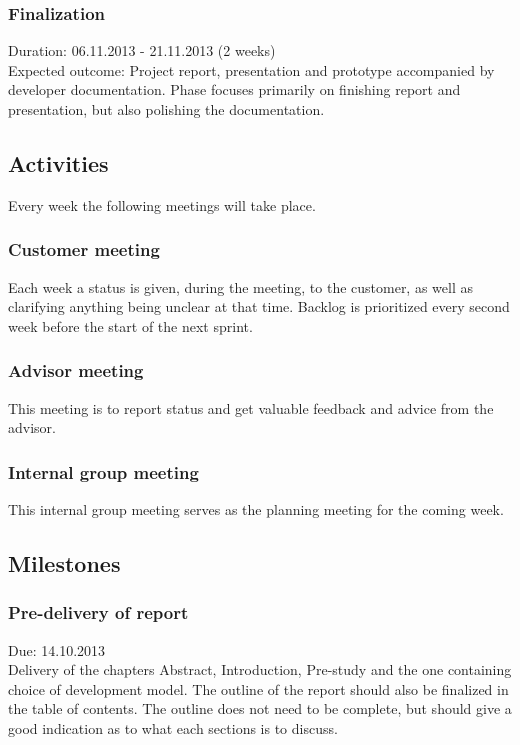 \documentclass[11pt]{book}
\begin{document}
\subsubsection{Finalization}
Duration: 06.11.2013 - 21.11.2013 (2 weeks)\\
Expected outcome: Project report, presentation and prototype accompanied by developer documentation. Phase focuses primarily on finishing report and presentation, but also polishing the documentation.

\subsection{Activities}
Every week the following meetings will take place.

\subsubsection{Customer meeting}
Each week a status is given, during the meeting, to the customer, as well as clarifying anything being unclear at that time. Backlog is prioritized every second week before the start of the next sprint.

\subsubsection{Advisor meeting}
This meeting is to report status and get valuable feedback and advice from the advisor.

\subsubsection{Internal group meeting}
This internal group meeting serves as the planning meeting for the coming week.

\subsection{Milestones}

\subsubsection{Pre-delivery of report}
Due: 14.10.2013\\
Delivery of the chapters Abstract, Introduction, Pre-study and the one containing choice of development model. The outline of the report should also be finalized in the table of contents. The outline does not need to be complete, but should give a good indication as to what each sections is to discuss.
\end{document}
